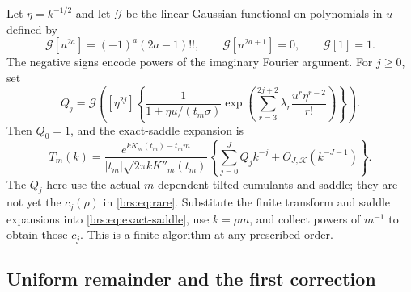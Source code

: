 \documentclass[11pt]{article}
\numberwithin{equation}{section}
\theoremstyle{remark}\newtheorem{remark}[theorem]{Remark}
\begin{document}
Let $\eta=k^{-1/2}$ and let $\mathcal G$ be the linear Gaussian
functional on polynomials in $u$ defined by
\[
 \mathcal G[u^{2a}]=(-1)^a(2a-1)!!,\qquad
 \mathcal G[u^{2a+1}]=0,\qquad \mathcal G[1]=1.
\]
The negative signs encode powers of the imaginary Fourier argument.
For $j\geq0$, set
\begin{equation}\label{brs:eq:Qj}
 Q_j=\mathcal G\!\left([\eta^{2j}]
 \left\{\frac1{1+\eta u/(t_m\sigma)}
 \exp\!\left(\sum_{r=3}^{2j+2}
       \lambda_r\frac{u^r\eta^{r-2}}{r!}\right)\right\}\right).
\end{equation}
Then $Q_0=1$, and the exact-saddle expansion is
\begin{equation}\label{brs:eq:exact-saddle}
 T_m(k)=\frac{e^{kK_m(t_m)-t_mm}}
 {|t_m|\sqrt{2\pi kK''_m(t_m)}}
 \left\{\sum_{j=0}^JQ_jk^{-j}+O_{J,\mathcal K}(k^{-J-1})\right\}.
\end{equation}
The $Q_j$ here use the actual $m$-dependent tilted cumulants and saddle;
they are not yet the $c_j(\rho)$ in \eqref{brs:eq:rare}.  Substitute the
finite transform and saddle expansions into \eqref{brs:eq:exact-saddle},
use $k=\rho m$, and collect powers of $m^{-1}$ to obtain those $c_j$.
This is a finite algorithm at any prescribed order.

\subsection{Uniform remainder and the first correction}
\end{document}

